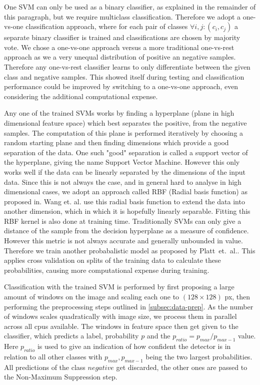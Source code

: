 \documentclass[11pt]{article}
\begin{document}
One SVM can only be used as a binary classifier, as explained in the remainder of this paragraph, but we require multiclass classification. 
Therefore we adopt a one-vs-one classification approach, where for each pair of classes \( \forall i,j: (c_i,c_j) \) a separate binary classifier is trained
and classifications are chosen by majority vote. We chose a one-vs-one approach versus a more traditional one-vs-rest approach as we a very unequal distribution of
positive an negative samples. Therefore any one-vs-rest classifier learns to only differentiate between the given class and negative samples. This showed itself 
during testing and classification performance could be improved by switching to a one-vs-one approach, even considering the additional computational expense.

Any one of the trained SVMs works by finding a hyperplane (plane in high dimensional feature space) which best separates the positive, from the negative samples.
The computation of this plane is performed iteratively by choosing a random starting plane and then finding dimensions which provide a good separation of the data. 
One such "good" separation is called a support vector of the hyperplane, giving the name Support Vector Machine. 
However this only works well if the data can be linearly separated by the dimensions of the input data. 
Since this is not always the case, and in general hard to analyse in high dimensional cases, we adopt an approach called RBF (Radial basis function) as proposed in\cite{10.1007/978-3-540-28647-9_85}.
Wang et. al. use this radial basis function to extend the data into another dimension, which in which it is hopefully linearly separable. Fitting this RBF kernel is also done at training time.
Traditionally SVMs can only give a distance of the sample from the decision hyperplane as a measure of confidence. 
However this metric is not always accurate and generally unbounded in value. Therefore we train another probabalistic model as proposed by Platt\ et.\ al.\cite{Platt99probabilisticoutputs}.
This applies cross validation on splits of the training data to calculate these probabilities, causing more computational expense during training.

Classification with the trained SVM is performed by first proposing a large amount of windows on the image and scaling each one to 
\( (128 \times 128) \) px, then performing the preprocessing steps outlined in \autoref{subsec:data-prep}. As the number of windows scales quadratically 
with image size, we process them in parallel across all cpus available. The windows in feature space then get given to the classifier, which predicts a label, probability \( p \) and the
\( p_{ratio} = p_{max} / p_{max - 1} \) value. Here \( p_{ratio} \) is used to give an indication of how confident the detector is in relation to all other classes with \( p_{max}, p_{max-1} \) being the two largest probabilities.
All predictions of the class \( negative \) get discarded, the other ones are passed to the Non-Maximum Suppression step.
\end{document}
